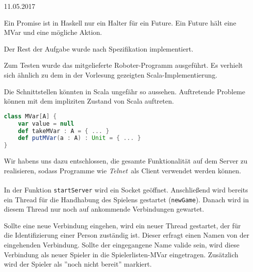 \documentclass{rp}
\begin{document}


{11.05.2017} %

%
Ein Promise ist in Haskell nur ein Halter für ein Future. Ein Future hält eine MVar und eine mögliche Aktion.

Der Rest der Aufgabe wurde nach Spezifikation implementiert. 

Zum Testen wurde das mitgelieferte Roboter-Programm ausgeführt. Es verhielt sich ähnlich zu dem in der Vorlesung gezeigten Scala-Implementierung.

Die Schnittstellen könnten in Scala ungefähr so aussehen. Auftretende Probleme können mit dem impliziten Zustand von Scala auftreten.  
\begin{lstlisting}[language=scala]
class MVar[A] {
    var value = null
    def takeMVar : A = { ... }
    def putMVar(a : A) : Unit = { ... }
}
\end{lstlisting}

Wir habens uns dazu entschlossen, die gesamte Funktionalität auf dem Server zu realisieren, sodass Programme wie \textit{Telnet} als Client verwendet werden können.\\\\

In der Funktion \texttt{startServer} wird ein Socket geöffnet. Anschließend wird bereits ein Thread für die Handhabung des Spielens gestartet (\texttt{newGame}). Danach wird in diesem Thread nur noch auf ankommende Verbindungen gewartet. 

Sollte eine neue Verbindung eingehen, wird ein neuer Thread gestartet, der für die Identifizierung einer Person zuständig ist. Dieser erfragt einen Namen von der eingehenden Verbindung. Sollte der eingegangene Name valide sein, wird diese Verbindung als neuer Spieler in die Spielerlisten-MVar eingetragen. Zusätzlich wird der Spieler als ''noch nicht bereit'' markiert. 
\end{document}
